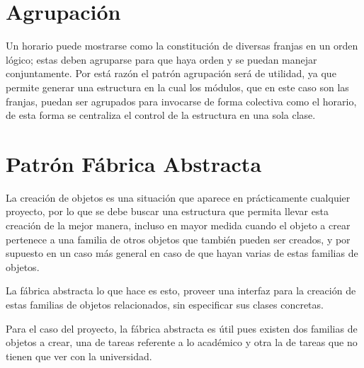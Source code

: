 
\section{Agrupación}
Un horario puede mostrarse como la constitución de diversas franjas en un orden lógico; estas deben agruparse para que haya orden y se puedan manejar conjuntamente. Por está razón el patrón agrupación será de utilidad, ya que permite generar una estructura en la cual los módulos, que en este caso son las franjas, puedan ser agrupados para invocarse de forma colectiva como el horario, de esta forma se centraliza el control de la estructura en una sola clase.


\section{Patrón Fábrica Abstracta}
La creación de objetos es una situación que aparece en prácticamente cualquier proyecto, por lo que se debe buscar una estructura que permita llevar esta creación de la mejor manera, incluso en mayor medida cuando el objeto a crear pertenece a una familia de otros objetos que también pueden ser creados, y por supuesto en un caso más general en caso de que hayan varias de estas familias de objetos.

La fábrica abstracta lo que hace es esto, proveer una interfaz para la creación de estas familias de objetos relacionados, sin especificar sus clases concretas.

Para el caso del proyecto, la fábrica abstracta es útil pues existen dos familias de objetos a crear, una de tareas referente a lo académico y otra la de tareas que no tienen que ver con la universidad.


